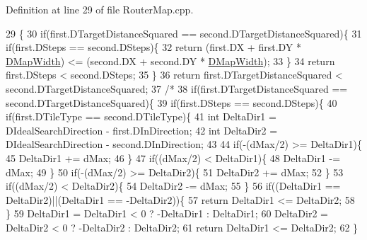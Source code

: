 Definition at line 29 of file Router\+Map.\+cpp.


\begin{DoxyCode}
29                                                                                            \{
30     \textcolor{keywordflow}{if}(first.DTargetDistanceSquared == second.DTargetDistanceSquared)\{
31         \textcolor{keywordflow}{if}(first.DSteps == second.DSteps)\{
32             \textcolor{keywordflow}{return} (first.DX + first.DY * \hyperlink{classCRouterMap_a9899b7a017d376a16af153f6f91159d3}{DMapWidth}) <= (second.DX + second.DY * 
      \hyperlink{classCRouterMap_a9899b7a017d376a16af153f6f91159d3}{DMapWidth});
33         \}
34         \textcolor{keywordflow}{return} first.DSteps < second.DSteps;
35     \}
36     \textcolor{keywordflow}{return} first.DTargetDistanceSquared < second.DTargetDistanceSquared;
37 \textcolor{comment}{/*    }
38 \textcolor{comment}{    if(first.DTargetDistanceSquared == second.DTargetDistanceSquared)\{}
39 \textcolor{comment}{        if(first.DSteps == second.DSteps)\{}
40 \textcolor{comment}{            if(first.DTileType == second.DTileType)\{}
41 \textcolor{comment}{                int DeltaDir1 = DIdealSearchDirection - first.DInDirection;}
42 \textcolor{comment}{                int DeltaDir2 = DIdealSearchDirection - second.DInDirection;}
43 \textcolor{comment}{                }
44 \textcolor{comment}{                if(-(dMax/2) >= DeltaDir1)\{}
45 \textcolor{comment}{                    DeltaDir1 += dMax;   }
46 \textcolor{comment}{                \}}
47 \textcolor{comment}{                if((dMax/2) < DeltaDir1)\{}
48 \textcolor{comment}{                    DeltaDir1 -= dMax;   }
49 \textcolor{comment}{                \}}
50 \textcolor{comment}{                if(-(dMax/2) >= DeltaDir2)\{}
51 \textcolor{comment}{                    DeltaDir2 += dMax;   }
52 \textcolor{comment}{                \}}
53 \textcolor{comment}{                if((dMax/2) < DeltaDir2)\{}
54 \textcolor{comment}{                    DeltaDir2 -= dMax;   }
55 \textcolor{comment}{                \}}
56 \textcolor{comment}{                if((DeltaDir1 == DeltaDir2)||(DeltaDir1 == -DeltaDir2))\{}
57 \textcolor{comment}{                    return DeltaDir1 <= DeltaDir2;    }
58 \textcolor{comment}{                \}}
59 \textcolor{comment}{                DeltaDir1 = DeltaDir1 < 0 ? -DeltaDir1 : DeltaDir1;}
60 \textcolor{comment}{                DeltaDir2 = DeltaDir2 < 0 ? -DeltaDir2 : DeltaDir2;}
61 \textcolor{comment}{                return DeltaDir1 <= DeltaDir2; }
62 \textcolor{comment}{            \}}

\end{DoxyCode}
